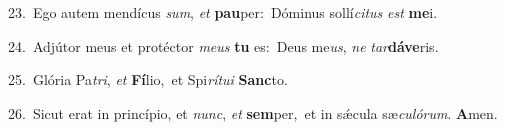 {\numbfont\textcolor{\numbcolor}{23.}}~Ego autem mendícus \textit{sum}\-, \textit{et} \textbf{pau}\-per:~\star Dóminus sollí\-\textit{ci}\-\textit{tus} \textit{est} \textbf{me}\-i.\par
{\numbfont\textcolor{\numbcolor}{24.}}~Adjútor meus et protéctor \textit{me}\-\textit{us} \textbf{tu} es:~\star Deus me\-\textit{us}\-, \textit{ne} \textit{tar}\-\textbf{dá}\textbf{ve}ris.\par
{\numbfont\textcolor{\numbcolor}{25.}}~Glória Pa\-\textit{tri}\-, \textit{et} \textbf{Fí}\-lio,~\star et Spi\-\textit{rí}\-\textit{tu}\textit{i} \textbf{Sanc}\-to.\par
{\numbfont\textcolor{\numbcolor}{26.}}~Sicut erat in princípio, et \textit{nunc}\-, \textit{et} \textbf{sem}\-per,~\star et in sǽcula sæ\-\textit{cu}\-\textit{ló}\textit{rum}. \textbf{A}\-men.\par
